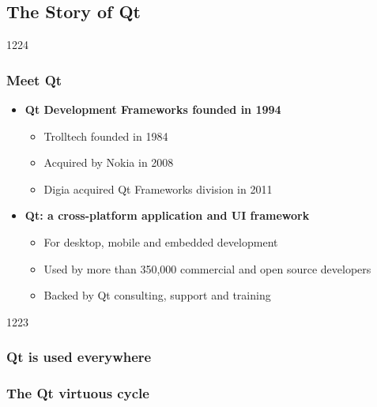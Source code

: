 %
%
%
%

\subsection{The Story of Qt}

\begin{slide}{1224}
  \frametitle{Meet Qt}
  \begin{itemize}
  \item \textbf{Qt Development Frameworks founded in 1994}
    \begin{itemize}
    \item Trolltech founded in 1984
    \item Acquired by Nokia in 2008
    \item Digia acquired Qt Frameworks division in 2011
    \end{itemize}
  \item \textbf{Qt: a cross-platform application and UI framework}
    \begin{itemize}
    \item For desktop, mobile and embedded development
    \item Used by more than 350,000 commercial and open source developers
    \item Backed by Qt consulting, support and training
    \end{itemize}
 \end{itemize}
 \vfill
\end{slide}

\begin{slide}{1223}
  \frametitle{Qt is used everywhere}
  \hspace*{0.025\pdfpagewidth}
\end{slide}

\begin{slide}
  \frametitle{The Qt virtuous cycle}
   \\
  \medskip
\end{slide}

